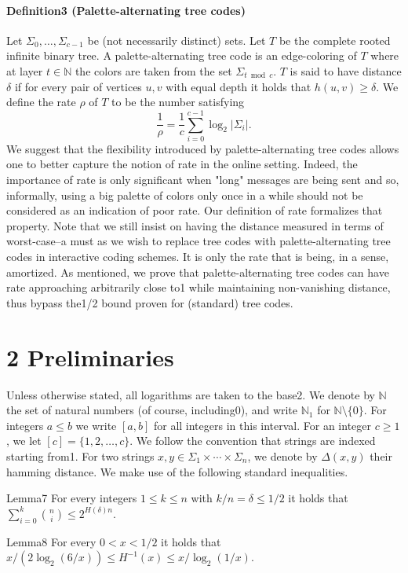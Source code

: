 \paragraph{Definition3 (Palette-alternating tree codes)}
Let $\Sigma_0,\ldots,\Sigma_{c-1}$ be (not necessarily distinct) sets. Let $T$ be the complete rooted infinite binary tree. A palette-alternating tree code is an edge-coloring of $T$ where at layer $t\in\mathbb N$ the colors are taken from the set $\Sigma_{t\bmod c}$. $T$ is said to have distance $\delta$ if for every pair of vertices $u,v$ with equal depth it holds that $h(u,v)\ge\delta$. We define the rate $\rho$ of $T$ to be the number satisfying
\[
\frac1\rho=\frac1c\sum_{i=0}^{c-1}\log_2|\Sigma_i|.
\]
We suggest that the flexibility introduced by palette-alternating tree codes allows one to better capture the notion of rate in the online setting. Indeed, the importance of rate is only significant when "long" messages are being sent and so, informally, using a big palette of colors only once in a while should not be considered as an indication of poor rate. Our definition of rate formalizes that property. Note that we still insist on having the distance measured in terms of worst-case--a must as we wish to replace tree codes with palette-alternating tree codes in interactive coding schemes. It is only the rate that is being, in a sense, amortized.
As mentioned, we prove that palette-alternating tree codes can have rate approaching arbitrarily close to1 while maintaining non-vanishing distance, thus bypass the1/2 bound proven for (standard) tree codes.
\section*{2 Preliminaries}
Unless otherwise stated, all logarithms are taken to the base2. We denote by $\mathbb N$ the set of natural numbers (of course, including0), and write $\mathbb N_1$ for $\mathbb N\setminus\{0\}$. For integers $a\le b$ we write $[a,b]$ for all integers in this interval. For an integer $c\ge1$, we let $[c]=\{1,2,\ldots,c\}$. We follow the convention that strings are indexed starting from1. For two strings $x,y\in\Sigma_1\times\cdots\times\Sigma_n$, we denote by $\Delta(x,y)$ their hamming distance. We make use of the following standard inequalities.
\begin{authorclaim}{Lemma7}
For every integers $1\le k\le n$ with $k/n=\delta\le1/2$ it holds that $\sum_{i=0}^k\binom ni\le2^{H(\delta)n}$.
\end{authorclaim}
\begin{authorclaim}{Lemma8}
For every $0<x<1/2$ it holds that $x/(2\log_2(6/x))\le H^{-1}(x)\le x/\log_2(1/x)$.
\end{authorclaim}
